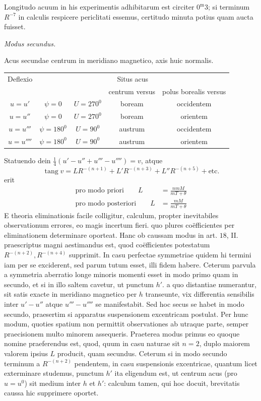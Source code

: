 \expandafter\def\csname HistoricalNoteText12\endcsname{Longitudo acuum in his experimentis adhibitarum est circiter $0^{\mathrm m}3$; si terminum $R^{-7}$ in calculis respicere periclitati essemus, certitudo minuta potius quam aucta fuisset.}
\begin{center}
\textit{Modus secundus.}\par
Acus secundae centrum in meridiano magnetico, axis huic normalis.
\begin{tabular}{c|cc|cc}
Deflexio&\multicolumn{4}{c}{Situs acus}\\
&&&centrum versus&polus borealis versus\\\hline
$u=u'$&$\psi=0$&$U=270^0$&boream&occidentem\\
$u=u''$&$\psi=0$&$U=270^0$&boream&orientem\\
$u=u'''$&$\psi=180^0$&$U=90^0$&austrum&occidentem\\
$u=u''''$&$\psi=180^0$&$U=90^0$&austrum&orientem
\end{tabular}
\end{center}

Statuendo dein $\frac14(u'-u''+u'''-u'''')=v$, atque
\[
\operatorname{tang}v=LR^{-(n+1)}+L'R^{-(n+3)}+L''R^{-(n+5)}+\text{etc.}
\]
erit
\[
\begin{aligned}
\text{pro modo priori}\qquad L&=\frac{nmM}{mT+\theta}\\
\text{pro modo posteriori}\qquad L&=\frac{mM}{mT+\theta}
\end{aligned}
\]
E theoria eliminationis facile colligitur, calculum, propter inevitabiles observationum errores, eo magis incertum fieri. quo plures coëfficientes per eliminationem determinare oporteat. Hanc ob caussam modus in art. $18$, II. praescriptus magni aestimandus est, quod coëfficientes potestatum $R^{-(n+2)},R^{-(n+4)}$ supprimit. In casu perfectae symmetriae quidem hi termini iam per se exciderent, sed parum tutum esset, illi fidem habere. Ceterum parvula a symmetria aberratio longe minoris momenti esset in modo primo quam in secundo, et si in illo saltem cavetur, ut punctum $h'$. a quo distantiae numerantur, sit satis exacte in meridiano magnetico per $h$ transeunte, vix differentia sensibilis inter $u'-u''$ atque $u'''-u''''$ se manifestabit. Sed hoc secus se habet in modo secundo, praesertim si apparatus suspensionem excentricam postulat. Per hunc modum, quoties spatium non permittit observationes ab utraque parte, semper praecisionem multo minorem assequeris. Praeterea modus primus eo quoque nomine praeferendus est, quod, quum in casu naturae sit $n=2$, duplo maiorem valorem ipsius $L$ producit, quam secundus. Ceterum si in modo secundo terminum a $R^{-(n+2)}$ pendentem, in casu suspensionis excentricae, quantum licet exterminare studemus,
punctum $h'$ ita eligendum est, ut centrum acus (pro $u=u^0$) sit medium inter $h$ et $h'$: calculum tamen, qui hoc docuit, brevitatis caussa hic supprimere oportet.

